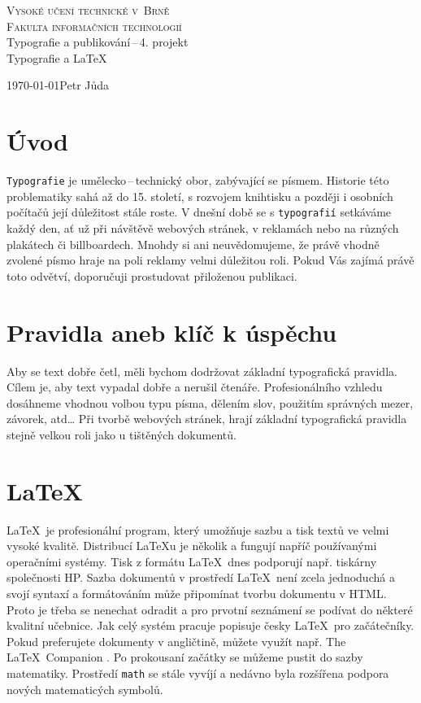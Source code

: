 \documentclass[11pt, a4paper, czech]{article}
\begin{document}
\begin{titlepage}
\begin{center}
\Huge
\textsc{Vysoké učení technické v~Brně\\
\huge
Fakulta informačních technologií\\}
\LARGE
{} Typografie a publikování\,--\,4. projekt\\
\Huge Typografie a \LaTeX {}
\end{center}
{\Large \today \hfill Petr Jůda}
\end{titlepage}


\section{Úvod}
\texttt{Typografie} je umělecko\,--\,technický obor, zabývající se písmem. \cite{Wikipedia:Typografie} Historie této problematiky sahá až do 15. století, s rozvojem knihtisku a později i osobních počítačů její důležitost stále roste. V dnešní době se s \texttt{typografií} setkáváme každý den, ať už při návštěvě webových stránek, v reklamách nebo na různých plakátech či billboardech. Mnohdy si ani neuvědomujeme, že právě vhodně zvolené písmo hraje na poli reklamy velmi důležitou roli. Pokud Vás zajímá právě toto odvětví, doporučuji prostudovat přiloženou publikaci. \cite{Kriz:Typograficke_moznosti_plakaty}

\section{Pravidla aneb klíč k úspěchu}
Aby se text dobře četl, měli bychom dodržovat základní typografická pravidla. \cite{pslib:Typograficka_pravidla} 
Cílem je, aby text vypadal dobře a nerušil čtenáře. Profesionálního vzhledu dosáhneme vhodnou volbou typu písma, dělením slov, použitím správných mezer, závorek, atd\dots
 Při tvorbě webových stránek, hrají základní typografická pravidla stejně velkou roli jako u tištěných dokumentů. \cite{Stastny:Navrh-internetovych-stranek}

\section{\LaTeX}
\LaTeX \ je profesionální program, který umožňuje sazbu a tisk textů ve velmi vysoké kvalitě. Distribucí \LaTeX u je několik a fungují napříč používanými operačními systémy. \cite{Wikipedia:Latex} Tisk z formátu \LaTeX \ dnes podporují např. tiskárny společnosti HP.\cite{Wireless-News:HP-Adds-to-Latex} Sazba dokumentů v prostředí \LaTeX \ není zcela jednoduchá a svojí syntaxí a  formátováním může připomínat tvorbu dokumentu v HTML. Proto je třeba se nenechat odradit a pro prvotní seznámení se podívat do některé kvalitní učebnice. Jak celý systém pracuje popisuje česky \LaTeX \ pro začátečníky. \cite{Rybicka:Latex-pro-zacatecniky} Pokud preferujete dokumenty v angličtině, můžete využít např. The \LaTeX \ Companion \cite{Mittelbach:The-Latex-Companion}. Po prokousaní začátky se můžeme pustit do sazby matematiky. Prostředí \texttt{math} se stále vyvíjí a nedávno byla rozšířena podpora nových matematicých symbolů. \cite{Gratzer:What-is-new-in-LaTeX}
\end{document}
